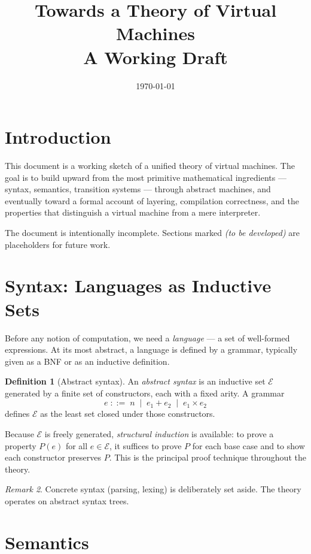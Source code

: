 \documentclass[11pt, a4paper]{article}
\title{\textbf{Towards a Theory of Virtual Machines} \\[0.4em]
       \large A Working Draft}
\author{}
\date{\today}
\theoremstyle{definition}
\newtheorem{definition}{Definition}[section]
\theoremstyle{plain}
\theoremstyle{remark}
\newtheorem{remark}[definition]{Remark}
\begin{document}
\maketitle
\tableofcontents
\newpage


\section{Introduction}

This document is a working sketch of a unified theory of virtual machines.
The goal is to build upward from the most primitive mathematical ingredients
--- syntax, semantics, transition systems --- through abstract machines, and
eventually toward a formal account of layering, compilation correctness, and
the properties that distinguish a virtual machine from a mere interpreter.

The document is intentionally incomplete. Sections marked \textit{(to be
developed)} are placeholders for future work.


\section{Syntax: Languages as Inductive Sets}

Before any notion of computation, we need a \emph{language} --- a set of
well-formed expressions. At its most abstract, a language is defined by a
grammar, typically given as a BNF or as an inductive definition.

\begin{definition}[Abstract syntax]
  An \emph{abstract syntax} is an inductive set $\mathcal{E}$ generated by a
  finite set of constructors, each with a fixed arity. A grammar
  \[
    e \;::=\; n \;\mid\; e_1 + e_2 \;\mid\; e_1 \times e_2
  \]
  defines $\mathcal{E}$ as the least set closed under those constructors.
\end{definition}

Because $\mathcal{E}$ is freely generated, \emph{structural induction} is
available: to prove a property $P(e)$ for all $e \in \mathcal{E}$, it suffices
to prove $P$ for each base case and to show each constructor preserves $P$.
This is the principal proof technique throughout the theory.

\begin{remark}
  Concrete syntax (parsing, lexing) is deliberately set aside. The theory
  operates on abstract syntax trees.
\end{remark}


\section{Semantics}
\end{document}
